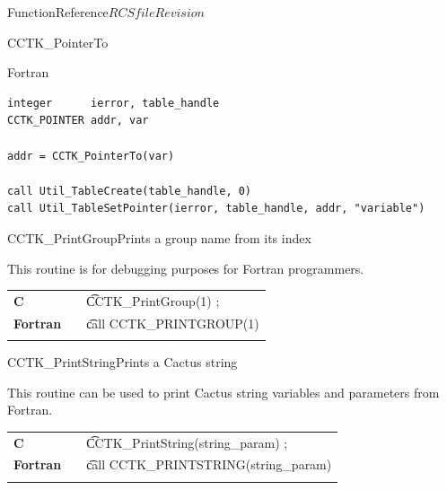 \begin{cactuspart}{FunctionReference}{$RCSfile$}{$Revision$}
\begin{FunctionDescription}{CCTK\_PointerTo}
\begin{ExampleSection}
\begin{Example}{Fortran}
\begin{verbatim}
integer      ierror, table_handle
CCTK_POINTER addr, var

addr = CCTK_PointerTo(var)

call Util_TableCreate(table_handle, 0)
call Util_TableSetPointer(ierror, table_handle, addr, "variable")
\end{verbatim}
\end{Example}
\end{ExampleSection}
\end{FunctionDescription}

\begin{CCTKFunc}{CCTK\_PrintGroup}{Prints a group name from its index}
\label{CCTK-PrintGroup}
\subroutine{}{}{}
\showargs
\begin{params}
\end{params}
\begin{discussion}
This routine is for debugging purposes for Fortran programmers.
\end{discussion}
\begin{examples}
\begin{tabular}{@{}p{3cm}cp{11cm}}
\hfill {\bf C} && {\t CCTK\_PrintGroup(1) ;}
\\
\hfill {\bf Fortran} && {\t call CCTK\_PRINTGROUP(1)}\\
\\
\end{tabular}
\end{examples}
\begin{errorcodes}
\end{errorcodes}
\end{CCTKFunc}

\begin{CCTKFunc}{CCTK\_PrintString}{Prints a Cactus string}
\label{CCTK-PrintString}
\subroutine{}{}{}
\showargs
\begin{params}
\end{params}
\begin{discussion}
This routine can be used to print Cactus string variables and parameters
from Fortran.
\end{discussion}
\begin{examples}
\begin{tabular}{@{}p{3cm}cp{11cm}}
\hfill {\bf C} && {\t CCTK\_PrintString(string\_param) ;}
\\
\hfill {\bf Fortran} && {\t call CCTK\_PRINTSTRING(string\_param)}\\
\\
\end{tabular}
\end{examples}
\begin{errorcodes}
\end{errorcodes}
\end{CCTKFunc}





\end{cactuspart}

